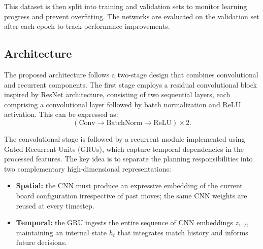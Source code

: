 \documentclass[tikz,12pt,a4paper]{article}
\theoremstyle{definition}
\begin{document}
This dataset is then split into training and validation sets to monitor learning progress and prevent overfitting. The networks are evaluated on the validation set after each epoch to track performance improvements.


\subsection{Architecture}
  The proposed architecture follows a two-stage design that combines convolutional and recurrent components. The first stage employs a residual convolutional block inspired by ResNet architecture, consisting of
  two sequential layers, each comprising a convolutional layer followed by batch normalization and ReLU activation. This can be expressed as:
  \[
  (\mathrm{Conv} \rightarrow \mathrm{BatchNorm} \rightarrow \mathrm{ReLU}) \times 2.
  \]

  The convolutional stage is followed by a recurrent module implemented using Gated Recurrent Units (GRUs), which capture temporal dependencies in the processed features. The key idea is to separate the planning
  responsibilities into two complementary high-dimensional representations:
  \begin{itemize}
      \item \textbf{Spatial:} the CNN must produce an expressive embedding of the current board configuration irrespective of past moves; the same CNN weights are reused at every timestep.
      \item \textbf{Temporal:} the GRU ingests the entire sequence of CNN embeddings \(z_{1:T}\), maintaining an internal state \(h_t\) that integrates match history and informs future decisions.
  \end{itemize}
\end{document}
